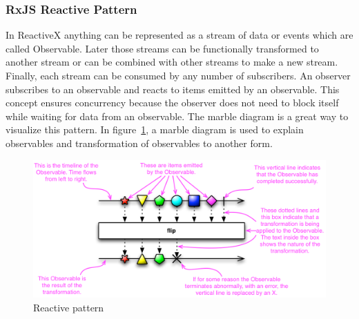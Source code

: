 \subsubsection{RxJS Reactive Pattern}
In ReactiveX anything can be represented as a stream of data or events which are called Observable. Later those streams can be functionally transformed to another stream or can be combined with other streams to make a new stream. Finally, each stream can be consumed by any number of subscribers. An observer subscribes to an observable and reacts to items emitted by an observable. This concept ensures concurrency because the observer does not need to block itself while waiting for data from an observable. The marble diagram is a great way to visualize this pattern. In figure~\ref{fig:rxjs-reactive-pattern}, a marble diagram is used to explain observables and transformation of observables to another form.
\begin{figure}[!h]
	\centering
	\includegraphics[scale=0.5,trim=0 0 0 0]{gfx/rxjs-reactive-pattern2.png}
	\caption{Reactive pattern \protect\cite{ReactiveXobservable}}
	\label{fig:rxjs-reactive-pattern}
\end{figure}

